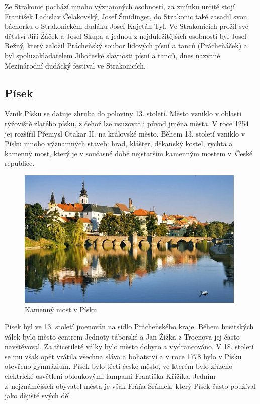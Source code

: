 \documentclass[thesis=M,czech]{FITthesis}[2012/06/26]
\begin{document}
Ze Strakonic pochází mnoho významných osobností, za zmínku určitě stojí František Ladislav Čelakovský, Josef Šmidinger, do Strakonic také zasadil svou báchorku o Strakonickém dudáku Josef Kajetán Tyl. Ve Strakonicích prožil své dětství Jiří Žáček a Josef Skupa a jednou z nejdůležitějších osobností byl Josef Režný, který založil Prácheňský soubor lidových písní a tanců (Prácheňáček) a byl spoluzakladatelem Jihočeské slavnosti písní a tanců, dnes nazvané Mezinárodní dudácký festival ve Strakonicích. \cite{obce}


\subsection{Písek}
Vznik Písku se datuje zhruba do poloviny 13. století. Město vzniklo v oblasti rýžoviště zlatého písku, z čehož lze usuzovat i původ jména města. V roce 1254 jej rozšířil Přemysl Otakar II. na královské město. Během 13. století vzniklo v Písku mnoho významných staveb: hrad, klášter, děkanský kostel, rychta a kamenný most, který je v současné době nejstarším kamenným mostem v~České republice. 

\begin{figure}[h!]
	\centering
	\includegraphics[width=11cm]{pics/pisek.jpg}
	\caption{Kamenný most v Písku}
	\label{obrazek:pisek}
\end{figure}

Písek byl ve 13. století jmenován na sídlo Prácheňského kraje. Během husitských válek bylo město centrem Jednoty táborské a Jan Žižka z Trocnova jej často navštěvoval. Za třicetileté války bylo město dobyto a vydrancováno. V 18. století se mu však opět vrátila všechna sláva a bohatství a v roce 1778 bylo v Písku otevřeno gymnázium. Písek bylo třetí české město, ve kterém bylo zřízeno elektrické osvětlení obloukovými lampami Františka Křižíka. Jedním z~nejznámějších obyvatel města je však Fráňa Šrámek, který Písek často používal jako dějiště svých děl. 
\end{document}
